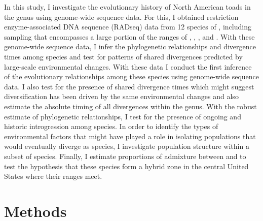 In this study, I investigate the evolutionary history of North American
toads in the genus \anaxyrus using genome-wide sequence data. 
For this, I obtained restriction enzyme-associated DNA sequence (RADseq) data
from 12 species of \anaxyrus, including sampling that encompasses a 
large portion of the ranges of \amer, \fowl, \terr, and \wood.
With these genome-wide sequence data, I infer the phylogenetic relationships and 
divergence times among \anaxyrus species and test for patterns of shared 
divergences predicted by large-scale environmental changes.
With these data I conduct the first inference of the evolutionary relationships 
among these species using genome-wide sequence data. 
I also test for the presence of shared divergence times which might suggest
\anaxyrus diversification has been driven by the same environmental changes
and also estimate the absolute timing of all divergences within the genus.
With the robust estimate of phylogenetic relationships, 
I test for the presence of ongoing and historic introgression among \anaxyrus species.
In order to identify the types of environmental factors that might have played
a role in isolating populations that would eventually diverge as species,
I investigate population structure within a subset of \anaxyrus species.
Finally, I estimate proportions of admixture between \fowl and \wood to test
the hypothesis that these species form a hybrid zone in the central United  
States where their ranges meet.



\section{Methods}
